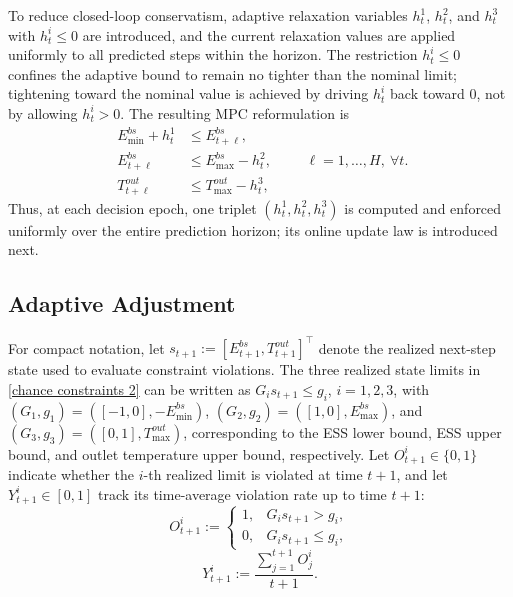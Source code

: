 \documentclass[a4paper,fleqn]{cas-dc}
\theoremstyle{plain}
\theoremstyle{remark}
\theoremstyle{plain}
\begin{document}
To reduce closed-loop conservatism, adaptive relaxation variables $h_t^1$, $h_t^2$, and $h_t^3$ with $h_t^i\le 0$ are introduced, and the current relaxation values are applied uniformly to all predicted steps within the horizon. The restriction $h_t^i\le 0$ confines the adaptive bound to remain no tighter than the nominal limit; tightening toward the nominal value is achieved by driving $h_t^i$ back toward $0$, not by allowing $h_t^i>0$. The resulting MPC reformulation is
\begin{equation} \label{MPC chance con}
\begin{aligned}
E_{\min}^{bs}+h_t^1 &\le E_{t+\ell}^{bs},\\
E_{t+\ell}^{bs} &\le E_{\max}^{bs}-h_t^2,\\
T_{t+\ell}^{out} &\le T_{\max}^{out}-h_t^3,
\end{aligned}
\qquad \ell=1,\ldots,H,\ \forall t.
\end{equation}
Thus, at each decision epoch, one triplet $(h_t^1,h_t^2,h_t^3)$ is computed and enforced uniformly over the entire prediction horizon; its online update law is introduced next.

\subsection{Adaptive Adjustment}\label{subsec:adaptive_adjustment}
For compact notation, let $s_{t+1}:=[E_{t+1}^{bs},T_{t+1}^{out}]^\top$ denote the realized next-step state used to evaluate constraint violations. The three realized state limits in \eqref{chance constraints 2} can be written as $G_i s_{t+1}\le g_i$, $i=1,2,3$, with
$(G_1,g_1)=([-1,0],-E_{\min}^{bs})$, $(G_2,g_2)=([1,0],E_{\max}^{bs})$, and $(G_3,g_3)=([0,1],T_{\max}^{out})$,
corresponding to the ESS lower bound, ESS upper bound, and outlet temperature upper bound, respectively. Let $O^{i}_{t+1} \in \{0,1\}$ indicate whether the $i$-th realized limit is violated at time $t+1$, and let $Y^{i}_{t+1} \in [0,1]$ track its time-average violation rate up to time $t+1$:
\begin{equation}\label{eq:Oi_def}
O^i_{t+1} :=
\begin{cases}
1, & G_i s_{t+1} > g_i,\\[2mm]
0, & G_i s_{t+1} \le g_i,
\end{cases}
\end{equation}
\begin{equation*}
Y_{t+1}^i := \frac{\sum_{j=1}^{t+1} O^i_j}{t+1}.
\end{equation*}
\end{document}
